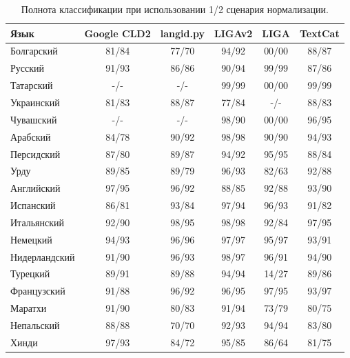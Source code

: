 \documentclass[a4paper, 14pt]{article}
\begin{document}
\begin{center}
\begin{table}
\begin{tabular*}{1.0\textwidth}{| l| *{5}{c} |}
\hline 
Язык & Google CLD2 & langid.py & LIGAv2 & LIGA & TextCat \\
\hline
\hline
Болгарский & 81/84 & 77/70 & 94/92 & 00/00 & 88/87 \\
Русский & 91/93 & 86/86 & 90/94 & 99/99 & 87/86 \\
Татарский & -/- & -/- & 99/99 & 00/00 & 99/99 \\
Украинский & 81/83 & 88/87 & 77/84 & -/- & 88/83 \\
Чувашский & -/- & -/- & 98/90 & 00/00 & 96/95 \\

\hline
\hline
Арабский & 84/78 & 90/92 & 98/98 & 90/90 & 94/93 \\
Персидский & 87/80 & 89/87 & 94/92 & 95/95 & 88/84 \\
Урду & 89/85 & 89/79 & 96/93 & 82/63 & 92/88 \\

\hline
\hline
Английский & 97/95 & 96/92 & 88/85 & 92/88 & 93/90 \\
Испанский & 86/81 & 93/84 & 97/94 & 96/93 & 91/82 \\
Итальянский & 92/90 & 98/95 & 98/98 & 92/84 & 97/95 \\
Немецкий & 94/93 & 96/96 & 97/97 & 95/97 & 93/91 \\
Нидерландский & 91/90 & 96/93 & 98/97 & 96/91 & 94/90 \\
Турецкий & 89/91 & 89/88 & 94/94 & 14/27 & 89/86 \\
Французский & 91/88 & 96/92 & 96/95 & 97/95 & 93/97 \\
\hline
\hline
Маратхи & 91/90 & 80/83 & 91/94 & 73/79 & 80/75 \\
Непальский & 88/88 & 70/70 & 92/93 & 94/94 & 83/80 \\
Хинди & 97/93 & 84/72 & 95/85 & 86/64 & 81/75 \\

\hline
\end{tabular*}
\caption{Полнота классификации при использовании 1/2 сценария нормализации.}
\end{table}
\end{center}


	\begin{center}
	\end{center}		
	
\end{document}

